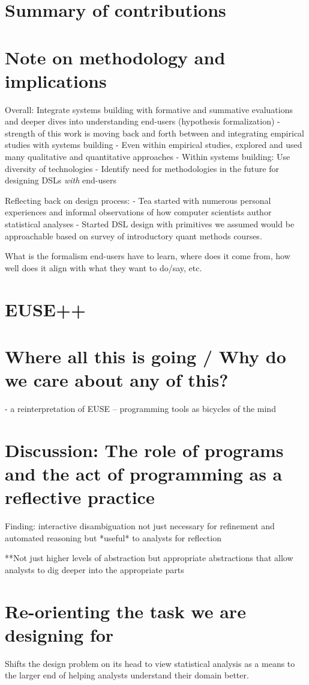 \section{Summary of contributions}
\section{Note on methodology and implications}
Overall: Integrate systems building with formative and summative evaluations and deeper dives into understanding end-users (hypothesis formalization)
- strength of this work is moving back and forth between and integrating empirical studies with systems building
- Even within empirical studies, explored and used many qualitative and quantitative approaches
- Within systems building: Use diversity of technologies
- Identify need for methodologies in the future for designing DSLs \textit{with} end-users

Reflecting back on design process: 
- Tea started with numerous personal experiences and informal observations of how computer scientists author statistical analyses
- Started DSL design with primitives we assumed would be approachable based on survey of introductory quant methods courses. 

What is the formalism end-users have to learn, where does it come from, how well does it align with what they want to do/say, etc.


\section{EUSE++}
\section{Where all this is going / Why do we care about any of this?}
- a reinterpretation of EUSE -- programming tools as bicycles of the mind

\section{Discussion: The role of programs and the act of programming as a reflective practice}
Finding: interactive disambiguation not just necessary for refinement and automated reasoning but *useful* to analysts for reflection

**Not just higher levels of abstraction but appropriate abstractions that allow analysts to dig deeper into the appropriate parts


\section{Re-orienting the task we are designing for}
Shifts the design problem on its head to view statistical analysis as a means to
the larger end of helping analysts understand their domain better.

